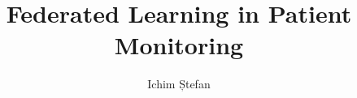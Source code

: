 \documentclass[3p,times,procedia]{elsarticle}
\begin{document}
\begin{frontmatter}



%


\title{\textbf{Federated Learning in Patient Monitoring}}




\author{Ichim Ștefan}

\begin{abstract}


\end{abstract}
\end{frontmatter}
\end{document}

